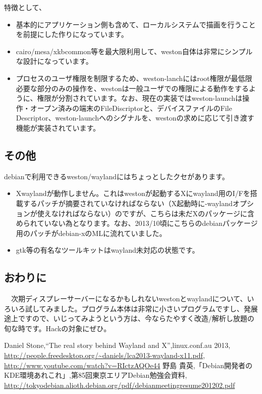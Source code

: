 \documentclass[mingoth,a4paper]{jsarticle}
\begin{document}
 特徴として、
\begin{itemize}
\item 基本的にアプリケーション側も含めて、ローカルシステムで描画を行うことを前提にした作りになっています。
\item cairo/mesa/xkbcommon等を最大限利用して、weston自体は非常にシンプルな設計になっています。
\item プロセスのユーザ権限を制限するため、weston-lanchにはroot権限が最低限必要な部分のみの操作を、westonは一般ユーザでの権限による動作をするように、権限が分割されています。なお、現在の実装ではweston-launchは操作・オープン済みの端末のFileDiscriptorと、デバイスファイルのFile Descriptor、weston-launchへのシグナルを、westonの求めに応じて引き渡す機能が実装されています。
\end{itemize}
\subsection{その他}

 debianで利用できるweston/waylandにはちょっとしたクセがあります。

 \begin{itemize}
\item Xwaylandが動作しません。これはwestonが起動するXにwayland用のI/Fを搭載するパッチが摘要されていなければならない（X起動時に-waylandオプションが使えなければならない）のですが、こちらは未だXのパッケージに含められていない為となります。なお、2013/10頃にこちらのdebianパッケージ用のパッチがdebian-xのMLに流れていました。
\item gtk等の有名なツールキットはwayland未対応の状態です。
 \end{itemize}

\subsection{おわりに}

　次期ディスプレーサーバーになるかもしれないwestonとwaylandについて、いろいろ試してみました。プログラム本体は非常に小さいプログラムですし、発展途上ですので、いじってみようという方は、今ならたやすく改造/解析し放題の旬な時です。Hackの対象にぜひ。

\begin{thebibliography}{0}
    {\footnotesize{
       Daniel Stone,``The real story behind Wayland and X'',linux.conf.au 2013,
       \url{http://people.freedesktop.org/~daniels/lca2013-wayland-x11.pdf},
       \url{http://www.youtube.com/watch?v=RIctzAQOe44}
       }}
    {\footnotesize{
       野島 貴英,「Debian開発者のKDE環境あれこれ」,第85回東京エリアDebian勉強会資料,
       \url{http://tokyodebian.alioth.debian.org/pdf/debianmeetingresume201202.pdf}
       }}
\end{thebibliography}
\end{document}
